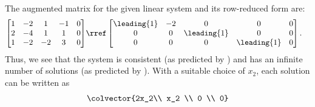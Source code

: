 The augmented matrix for the given linear system and its row-reduced form are:
\begin{align*}
\begin{bmatrix}
1 & -2 & 1 & -1 & 0\\
2 & -4 & 1 & 1 & 0\\
1 & -2 & -2 & 3 & 0
\end{bmatrix}
&\rref
\begin{bmatrix}
\leading{1} & -2 & 0 & 0 & 0\\
0 & 0 & \leading{1} & 0 & 0\\
0 & 0 & 0 & \leading{1} & 0
\end{bmatrix}.
\end{align*}
Thus, we see that the system is consistent (as predicted by ) and has an infinite number of solutions (as predicted by ).  With a suitable choice of $x_2$, each solution can be written as 
%
\begin{align*}
\colvector{2x_2\\ x_2 \\ 0 \\ 0}
\end{align*}
